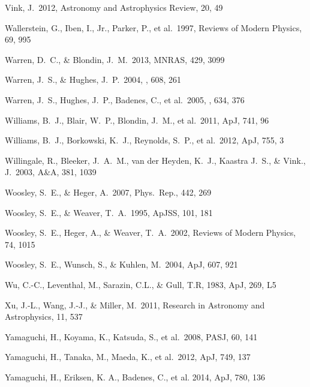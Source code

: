 \documentclass[11pt,a4paper]{article}
\begin{document}
{\begin{multicols}{2}
{\begin{thebibliography}{99}
 Vink, J.\ 2012,  Astronomy and
  Astrophysics Review, 20, 49

 Wallerstein, G., 
Iben, I., Jr., Parker, P., et al.\ 1997, Reviews of Modern Physics, 69, 995 

Warren, D.~C., \& Blondin, J.~M.\ 2013, MNRAS, 429, 3099

 Warren, J.~S., \&
  Hughes, J.~P.\ 2004, \apj, 608, 261

 Warren, J.~S., Hughes, 
J.~P., Badenes, C., et al.\ 2005, \apj, 634, 376 

 Williams, B.~J., Blair,
  W.~P., Blondin, J.~M., et al.\ 2011, ApJ, 741, 96

 Williams, B.~J.,
  Borkowski, K.~J., Reynolds, S.~P., et al.\ 2012, ApJ, 755, 3

Willingale, R., Bleeker, J.~A.~M., van der Heyden, K.~J., Kaastra J.~S., \&
Vink., J.\ 2003, A\&A, 381, 1039

 Woosley, S.~E., \& Heger,
  A.\ 2007, Phys.~Rep., 442, 269

 Woosley, S.~E., \& Weaver,
  T.~A.\ 1995, ApJSS, 101, 181

 Woosley, S.~E., Heger, 
A., \& Weaver, T.~A.\ 2002, Reviews of Modern Physics, 74, 1015 

 Woosley, S.~E., Wunsch, S.,
  \& Kuhlen, M.\ 2004, ApJ, 607, 921

 Wu, C.-C., Leventhal, M., Sarazin,
  C.L., \& Gull, T.R, 1983, ApJ, 269, L5

Xu, J.-L., Wang, J.-J., \& Miller, M.\ 2011, Research in Astronomy and Astrophysics, 11, 537

 Yamaguchi, H., Koyama,
  K., Katsuda, S., et al.\ 2008, PASJ, 60, 141

 Yamaguchi, H.,
Tanaka, M., Maeda, K., et al.\ 2012, ApJ, 749, 137

 Yamaguchi, H., Eriksen, K. A., Badenes, C., et al. 2014, ApJ, 780, 136


\end{thebibliography}}
\end{multicols}}
\end{document}
